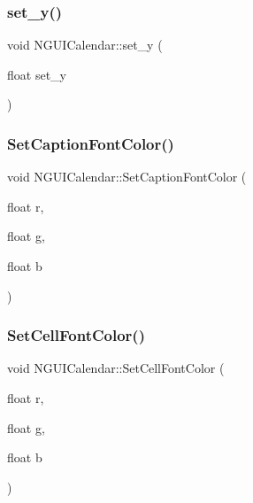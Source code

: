 \hypertarget{class_n_g_u_i_calendar_a5bc5746a345a1b560a2e2cc810f53ae4}{}\label{class_n_g_u_i_calendar_a5bc5746a345a1b560a2e2cc810f53ae4} 
\subsubsection{\texorpdfstring{set\+\_\+y()}{set\_y()}}
{\footnotesize\ttfamily void N\+G\+U\+I\+Calendar\+::set\+\_\+y (\begin{DoxyParamCaption}\item[{float}]{set\+\_\+y }\end{DoxyParamCaption})}

\hypertarget{class_n_g_u_i_calendar_a8b21f4f1913bb057e2faa43bfdb9e5be}{}\label{class_n_g_u_i_calendar_a8b21f4f1913bb057e2faa43bfdb9e5be} 
\subsubsection{\texorpdfstring{Set\+Caption\+Font\+Color()}{SetCaptionFontColor()}}
{\footnotesize\ttfamily void N\+G\+U\+I\+Calendar\+::\+Set\+Caption\+Font\+Color (\begin{DoxyParamCaption}\item[{float}]{r,  }\item[{float}]{g,  }\item[{float}]{b }\end{DoxyParamCaption})}

\hypertarget{class_n_g_u_i_calendar_ad4f6090f433f634493c0df83ee034b54}{}\label{class_n_g_u_i_calendar_ad4f6090f433f634493c0df83ee034b54} 
\subsubsection{\texorpdfstring{Set\+Cell\+Font\+Color()}{SetCellFontColor()}}
{\footnotesize\ttfamily void N\+G\+U\+I\+Calendar\+::\+Set\+Cell\+Font\+Color (\begin{DoxyParamCaption}\item[{float}]{r,  }\item[{float}]{g,  }\item[{float}]{b }\end{DoxyParamCaption})}

